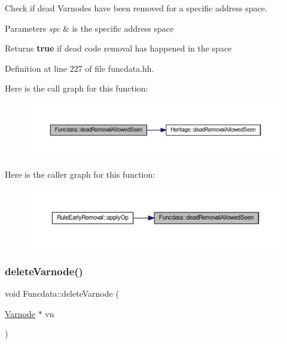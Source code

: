 Check if dead Varnodes have been removed for a specific address space. 


\begin{DoxyParams}{Parameters}
{\em spc} & is the specific address space \\
\hline
\end{DoxyParams}
\begin{DoxyReturn}{Returns}
{\bfseries{true}} if dead code removal has happened in the space 
\end{DoxyReturn}


Definition at line 227 of file funcdata.\+hh.

Here is the call graph for this function\+:
\nopagebreak
\begin{figure}[H]
\begin{center}
\leavevmode
\includegraphics[width=350pt]{class_funcdata_adba7696040378f0eaa679e684b72bf96_cgraph}
\end{center}
\end{figure}
Here is the caller graph for this function\+:
\nopagebreak
\begin{figure}[H]
\begin{center}
\leavevmode
\includegraphics[width=350pt]{class_funcdata_adba7696040378f0eaa679e684b72bf96_icgraph}
\end{center}
\end{figure}
\mbox{\label{class_funcdata_aa8657c4c04279316593adc6d2f389be5}} 
\subsubsection{\texorpdfstring{deleteVarnode()}{deleteVarnode()}}
{\footnotesize\ttfamily void Funcdata\+::delete\+Varnode (\begin{DoxyParamCaption}\item[{\mbox{\hyperlink{class_varnode}{Varnode}} $\ast$}]{vn }\end{DoxyParamCaption})\hspace{0.3cm}{\ttfamily [inline]}}



